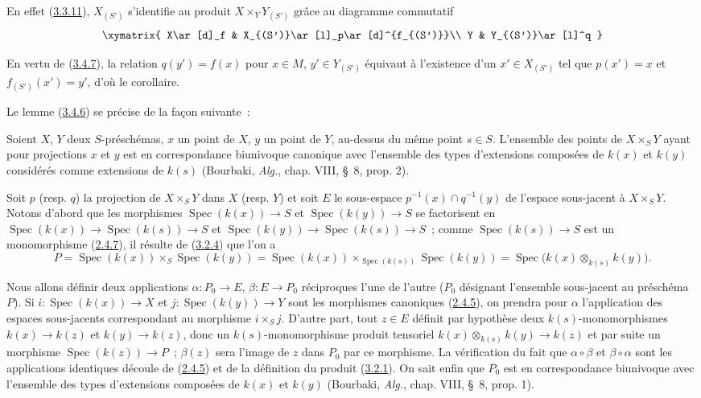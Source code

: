 En effet (\hyperref[I.3.3.11-fr]{3.3.11}), $X_{(S')}$ s'identifie au produit
$X\times_Y Y_{(S')}$ grâce au diagramme commutatif
\label{I.3.4.8.proof-diagram-fr}
\[
  \xymatrix{
    X\ar[d]_f & X_{(S')}\ar[l]_p\ar[d]^{f_{(S')}}\\
    Y & Y_{(S')}\ar[l]^q
  }
\]

En vertu de (\hyperref[I.3.4.7-fr]{3.4.7}), la relation $q(y')=f(x)$ pour
$x\in M$, $y'\in Y_{(S')}$ équivaut à l'existence d'un $x'\in X_{(S')}$ tel
que $p(x')=x$ et $f_{(S')}(x')=y'$, d'où le corollaire.

Le lemme (\hyperref[I.3.4.6-fr]{3.4.6}) se précise de la façon suivante~:

\begin{proposition}[3.4.9]
\label{I.3.4.9-fr}
Soient $X$, $Y$ deux $S$-préschémas, $x$ un point de $X$, $y$ un point de $Y$,
au-dessus du même point $s\in S$. L'ensemble des points de $X\times_S Y$ ayant
pour projections $x$ et $y$ est en correspondance biunivoque canonique avec
l'ensemble des types d'extensions composées de $k(x)$ et $k(y)$ considérés
comme extensions de $k(s)$ (Bourbaki, \emph{Alg.}, chap. VIII, \S~8, prop. 2).
\end{proposition}

Soit $p$ (resp. $q$) la projection de $X\times_S Y$ dans $X$ (resp. $Y$) et
soit $E$ le sous-espace $p^{-1}(x)\cap q^{-1}(y)$ de l'espace sous-jacent à
$X\times_S Y$. Notons d'abord que les morphismes
$\operatorname{Spec}(k(x))\to S$ et $\operatorname{Spec}(k(y))\to S$ se
factorisent en
$\operatorname{Spec}(k(x))\to\operatorname{Spec}(k(s))\to S$ et
$\operatorname{Spec}(k(y))\to\operatorname{Spec}(k(s))\to S$~; comme
$\operatorname{Spec}(k(s))\to S$ est un monomorphisme
(\hyperref[I.2.4.7-fr]{2.4.7}), il résulte de
(\hyperref[I.3.2.4-fr]{3.2.4}) que l'on a
\label{I.3.4.9.tensor-product-fibre-fr}
\[
  P=\operatorname{Spec}(k(x))\times_S\operatorname{Spec}(k(y))
  =\operatorname{Spec}(k(x))\times_{\operatorname{Spec}(k(s))}
   \operatorname{Spec}(k(y))
  =\operatorname{Spec}\bigl(k(x)\otimes_{k(s)}k(y)\bigr).
\]

Nous allons définir deux applications $\alpha:P_0\to E$, $\beta:E\to P_0$
réciproques l'une de l'autre ($P_0$ désignant l'ensemble sous-jacent au
préschéma $P$). Si $i:\operatorname{Spec}(k(x))\to X$ et
$j:\operatorname{Spec}(k(y))\to Y$ sont les morphismes canoniques
(\hyperref[I.2.4.5-fr]{2.4.5}), on prendra pour $\alpha$ l'application des
espaces sous-jacents correspondant au morphisme $i\times_S j$. D'autre part,
tout $z\in E$ définit par hypothèse deux $k(s)$-monomorphismes
$k(x)\to k(z)$ et $k(y)\to k(z)$, donc un $k(s)$-monomorphisme produit
tensoriel $k(x)\otimes_{k(s)}k(y)\to k(z)$ et par suite un morphisme
$\operatorname{Spec}(k(z))\to P$~; $\beta(z)$ sera l'image de $z$ dans $P_0$
par ce morphisme. La vérification du fait que $\alpha\circ\beta$ et
$\beta\circ\alpha$ sont les applications identiques découle de
(\hyperref[I.2.4.5-fr]{2.4.5}) et de la définition du produit
(\hyperref[I.3.2.1-fr]{3.2.1}). On sait enfin que $P_0$ est en correspondance
biunivoque avec l'ensemble des types d'extensions composées de $k(x)$ et
$k(y)$ (Bourbaki, \emph{Alg.}, chap. VIII, \S~8, prop. 1).

